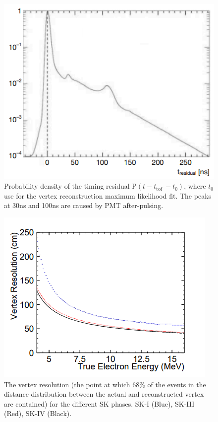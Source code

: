 \begin{figure}
    \includegraphics[width=\textwidth]{Figures/bonsai_pdf_res.png}
\caption{Probability density of the timing residual P$(t-t_{\text {tof }}-t_{0})$, where $t_{0}$ use for the vertex reconstruction maximum likelihood fit. The peaks at 30ns and 100ns are caused by PMT after-pulsing.}
    \label{bonsaivertexpdf}
\end{figure}

\begin{figure}
    \includegraphics[width=\textwidth]{Figures/bonsai_vertex_res.png}
\caption{The vertex resolution (the point at which 68\% of the events in the distance distribution between the actual and reconstructed vertex are contained) for the different SK phases. SK-I (Blue), SK-III (Red), SK-IV (Black).}
    \label{bonsaivertexres}
\end{figure}

